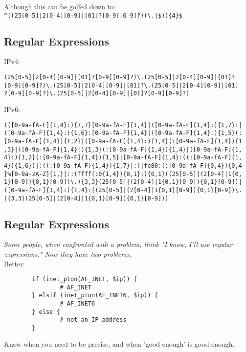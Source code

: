\documentclass[xga]{xdvislides}
\begin{document}
Although this can be golfed down to: \\
\verb+^((25[0-5]|2[0-4][0-9]|[01]?[0-9][0-9]?)(\.|$)){4}$+

\subsection{Regular Expressions}
IPv4:
\begin{verbatim}
(25[0-5]|2[0-4][0-9]|[01]?[0-9][0-9]?)\.(25[0-5]|2[0-4][0-9]|[01]?
[0-9][0-9]?)\.(25[0-5]|2[0-4][0-9]|[01]?\.(25[0-5]|2[0-4][0-9]|[01]
?[0-9][0-9]?)\.(25[0-5]|2[0-4][0-9]|[01]?[0-9][0-9]?)
\end{verbatim}

IPv6:
\begin{verbatim}
(([0-9a-fA-F]{1,4}:){7,7}[0-9a-fA-F]{1,4}|([0-9a-fA-F]{1,4}:){1,7}:|
([0-9a-fA-F]{1,4}:){1,6}:[0-9a-fA-F]{1,4}|([0-9a-fA-F]{1,4}:){1,5}(:
[0-9a-fA-F]{1,4}){1,2}|([0-9a-fA-F]{1,4}:){1,4}(:[0-9a-fA-F]{1,4}){1
,3}|([0-9a-fA-F]{1,4}:){1,3}(:[0-9a-fA-F]{1,4}){1,4}|([0-9a-fA-F]{1,
4}:){1,2}(:[0-9a-fA-F]{1,4}){1,5}|[0-9a-fA-F]{1,4}:((:[0-9a-fA-F]{1,
4}){1,6})|:((:[0-9a-fA-F]{1,4}){1,7}|:)|fe80:(:[0-9a-fA-F]{0,4}){0,4
}%[0-9a-zA-Z]{1,}|::(ffff(:0{1,4}){0,1}:){0,1}((25[0-5]|(2[0-4]|1{0,
1}[0-9]){0,1}[0-9])\.){3,3}(25[0-5]|(2[0-4]|1{0,1}[0-9]){0,1}[0-9])|
([0-9a-fA-F]{1,4}:){1,4}:((25[0-5]|(2[0-4]|1{0,1}[0-9]){0,1}[0-9])\.
){3,3}(25[0-5]|(2[0-4]|1{0,1}[0-9]){0,1}[0-9]))
\end{verbatim}

\subsection{Regular Expressions}
{\em Some people, when confronted with a problem,
think "I know, I'll use regular expressions." Now they
have two problems.} \\

Better:
\begin{verbatim}
        if (inet_pton(AF_INET, $ip)) {
                # AF_INET
        } elsif (inet_pton(AF_INET6, $ip)) {
                # AF_INET6
        } else {
                # not an IP address
        }
\end{verbatim}

Know when you need to be precise, and when 'good
enough' is good enough.
\end{document}

